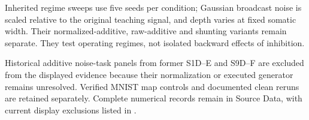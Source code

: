 Inherited regime sweeps use five seeds per condition; Gaussian broadcast noise is scaled relative to the original teaching signal, and depth varies at fixed somatic width. Their normalized-additive, raw-additive and shunting variants remain separate. They test operating regimes, not isolated backward effects of inhibition.

Historical additive noise-task panels from former S1D--E and S9D--F are excluded from the displayed evidence because their normalization or executed generator remains unresolved. Verified MNIST map controls and documented clean reruns are retained separately. Complete numerical records remain in Source Data, with current display exclusions listed in .
